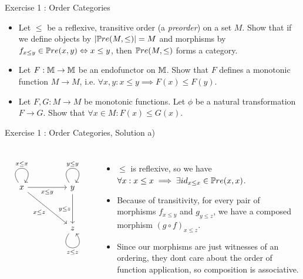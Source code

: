 \begin{frame}{Exercise 1 : Order Categories}
\begin{itemize}
	\item[a)] Let $\leq$ be a reflexive, transitive order (a \textit{preorder}) on a set $M$. Show that if we define objects by $|\mathbb{P}re(M, \leq)| = M$ and morphisms by $f_{x \leq y} \in \mathbb{P}re(x,y) \Leftrightarrow x \leq y$, then $\mathbb{P}re(M, \leq)$ forms a category.
	\item[b)] Let $F : \mathbb{M} \to \mathbb{M}$ be an endofunctor on $\mathbb{M}$. Show that $F$ defines a monotonic function $M \to M$, i.e. $\forall x,y : x \leq y \implies F(x) \leq F(y)$.
	\item[c)] Let $F,G : M \to M$ be monotonic functions. Let $\phi$ be a natural transformation $F \to G$. Show that $\forall x \in M: F(x) \leq G(x)$.
\end{itemize}
\end{frame}
\begin{frame}[fragile]{Exercise 1 : Order Categories, Solution a)}
	\begin{columns}
		\[\begin{tikzcd}
			x && y \\
			\\
			&& z
			\arrow["{x \leq x}", from=1-1, to=1-1, loop, in=55, out=125, distance=10mm]
			\arrow["{{x \leq y}}"', from=1-1, to=1-3]
			\arrow["{{x \leq z}}"', from=1-1, to=3-3]
			\arrow["{y \leq y}", from=1-3, to=1-3, loop, in=55, out=125, distance=10mm]
			\arrow["{{y \leq z}}"', from=1-3, to=3-3]
			\arrow["{z \leq z}"', from=3-3, to=3-3, loop, in=305, out=235, distance=10mm]
		\end{tikzcd}\]
		\begin{itemize}
			\item $\leq$ is reflexive, so we have $\forall x : x \leq x \implies \exists id_{x \leq x} \in \mathbb{P}re(x,x)$.
			\item Because of transitivity, for every pair of morphisms $f_{x \leq y}$ and $g_{y \leq z}$, we have a composed morphism $(g \circ f)_{x \leq z}$.
			\item Since our morphisms are just witnesses of an ordering, they dont care about the order of function application, so composition is associative.
		\end{itemize} 
	\end{columns} 
\end{frame}
